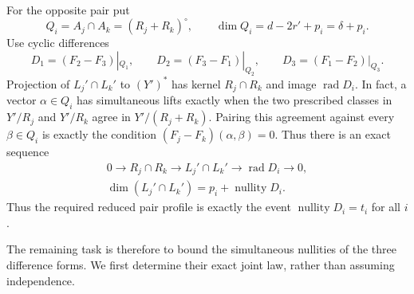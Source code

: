 For the opposite pair put
\begin{equation}\label{eq:planted-pair-annihilators}
 Q_i=A_j\cap A_k=(R_j+R_k)^\circ,
 \qquad \dim Q_i=d-2r'+p_i=\delta+p_i.
\end{equation}
Use cyclic differences
\[
 D_1=(F_2-F_3)|_{Q_1},\qquad
 D_2=(F_3-F_1)|_{Q_2},\qquad
 D_3=(F_1-F_2)|_{Q_3}.
\]
Projection of $L_j'\cap L_k'$ to $(Y')^*$ has kernel
$R_j\cap R_k$ and image $\operatorname{rad}D_i$.  In fact, a vector
$\alpha\in Q_i$ has simultaneous lifts exactly when the two
prescribed classes in $Y'/R_j$ and $Y'/R_k$ agree in
$Y'/(R_j+R_k)$.  Pairing this agreement against every
$\beta\in Q_i$ is exactly the condition
$(F_j-F_k)(\alpha,\beta)=0$.  Thus there is an exact sequence
\begin{equation}\label{eq:planted-pair-exact-sequence}
 \begin{gathered}
 0\longrightarrow R_j\cap R_k
 \longrightarrow L_j'\cap L_k'
 \longrightarrow\operatorname{rad}D_i\longrightarrow0,\\
 \dim(L_j'\cap L_k')=p_i+\operatorname{nullity}D_i.
 \end{gathered}
\end{equation}
Thus the required reduced pair profile is exactly the event
$\operatorname{nullity}D_i=t_i$ for all $i$.

The remaining task is therefore to bound the simultaneous nullities of
the three difference forms. We first determine their exact joint law,
rather than assuming independence.


